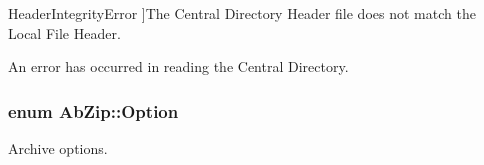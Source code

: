 \begin{Desc}
\begin{description}
{Header\+Integrity\+Error\hypertarget{class_ab_zip_ac669c2fce0fbde75677d12711c11c504aeb03e302df4c361ec623ab72ccffb49a}{}\label{class_ab_zip_ac669c2fce0fbde75677d12711c11c504aeb03e302df4c361ec623ab72ccffb49a}
}]The Central Directory Header file does not match the Local File Header. \item[{\em 
Central\+Dir\+Error\hypertarget{class_ab_zip_ac669c2fce0fbde75677d12711c11c504ae3c62cab02d3f6fecb706cb8641e0708}{}\label{class_ab_zip_ac669c2fce0fbde75677d12711c11c504ae3c62cab02d3f6fecb706cb8641e0708}
}]An error has occurred in reading the Central Directory. \end{description}
\end{Desc}
\subsubsection[{\texorpdfstring{Option}{Option}}]{\setlength{\rightskip}{0pt plus 5cm}enum {\bf Ab\+Zip\+::\+Option}}\hypertarget{class_ab_zip_a9c4f57d6b8d9a449c2eb6c4d4e53c9d5}{}\label{class_ab_zip_a9c4f57d6b8d9a449c2eb6c4d4e53c9d5}


Archive options. 

